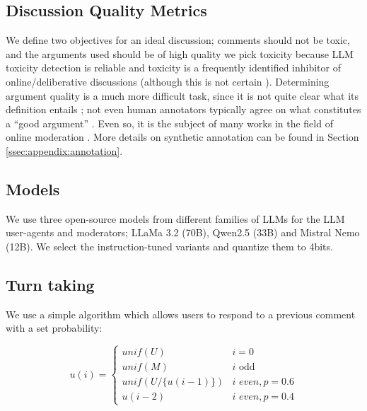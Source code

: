 \subsection{Discussion Quality Metrics}

We define two objectives for an ideal discussion; comments should not be toxic, and the arguments used should be of high quality we pick toxicity because \ac{LLM} toxicity detection is reliable \citep{kang-qian-2024-implanting, Wang2022ToxicityDW, anjum2024hate} and toxicity is a frequently identified inhibitor of online/deliberative discussions \citep{dekock2022disagree, XiaToxicity} (although this is not certain \citep{Avalle2024PersistentIP}). Determining argument quality is a much more difficult task, since it is not quite clear what its definition entails \cite{korre2025evaluation}; not even human annotators typically agree on what constitutes a “good argument” \cite{argyle2023}. Even so, it is the subject of many works in the field of online moderation \cite{argyle2023, schroeder-etal-2024-fora, falk-etal-2024-moderation, falk-etal-2021-predicting}. More details on synthetic annotation can be found in Section \ref{ssec:appendix:annotation}.


\subsection{Models}
\label{ssec:experimental:model}

We use three open-source models from different families of \acp{LLM} for the \ac{LLM} user-agents and moderators; LLaMa 3.2 (70B), Qwen2.5 (33B) and Mistral Nemo (12B). We select the instruction-tuned variants and quantize them to 4bits.


\subsection{Turn taking}
\label{ssec:experimental:turn}

We use a simple algorithm which allows users to respond to a previous comment with a set probability:

\small
\begin{equation}
\label{eq:turn_taking}
    u(i) = \left\{
\begin{array}{ll}
\textit{unif}(U) & i=0\\
    \textit{unif}(M) & i \text{ odd}\\
    \textit{unif}(U/\{u(i-1)\}) & i \textit{ even}, p=0.6 \\
    u(i-2) & i \textit{ even}, p=0.4 
\end{array} 
\right.
\end{equation}
\normalsize

